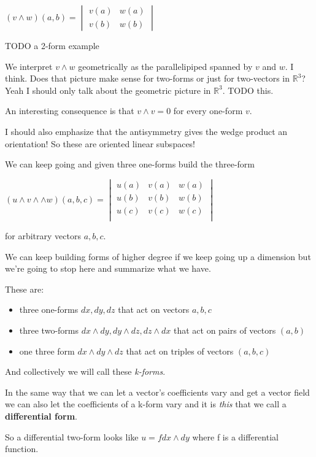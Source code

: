 \documentclass{article}
\begin{document}
$
(v \wedge w) (a, b) =
\begin{vmatrix}
  v (a) & w (a) \\
  v (b) & w (b)
\end{vmatrix}
$

TODO a 2-form example

We interpret $v \wedge w$ geometrically as the parallelipiped spanned by $v$ and
$w$. I think. Does that picture make sense for two-forms or just for two-vectors
in $\mathbb{R}^{3}$? Yeah I should only talk about the geometric picture in
$\mathbb{R}^{3}$. TODO this.

An interesting consequence is that $v \wedge v = 0$ for every one-form $v$.

I should also emphasize that the antisymmetry gives the wedge product an
orientation! So these are oriented linear subspaces!

We can keep going and given three one-forms build the three-form

$
(u \wedge v \wedge \wedge w) (a, b, c) =
\begin{vmatrix}
  u (a) & v (a) & w (a) \\
  u (b) & v (b) & w (b) \\
  u (c) & v (c) & w (c) \\
\end{vmatrix}
$

for arbitrary vectors $a, b, c$.

We can keep building forms of higher degree if we keep going up a dimension but
we're going to stop here and summarize what we have.

These are:

\begin{itemize}
  \item three one-forms $dx, dy, dz$ that act on vectors $a, b, c$
  \item three two-forms $dx \wedge dy, dy \wedge dz, dz \wedge dx$ that act on
    pairs of vectors $(a, b)$
  \item one three form $dx \wedge dy \wedge dz$ that act on triples of vectors
    $(a, b, c)$
\end{itemize}

And collectively we will call these \textit{k-forms}.

In the same way that we can let a vector's coefficients vary and get a vector
field we can also let the coefficients of a k-form vary and
it is \textit{this} that we call a \textbf{differential form}.

So a differential two-form looks like $u = f dx \wedge dy$ where f is a
differential function.
\end{document}
